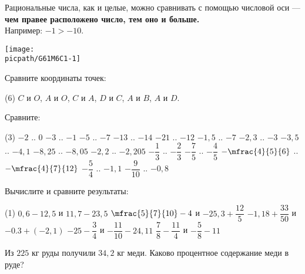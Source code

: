 	\begin{consultation}
		\begin{definit}
			Рациональные числа, как и целые, можно сравнивать с помощью числовой оси --- \textbf{чем правее расположено число, тем оно и больше.} \\ Например: \( -1 > -10 \).
		\end{definit}
		\begin{listofex}
			\item
			
			\begin{minipage}[c]{0.45\textwidth}
				\texttt{[image: \\picpath/G61M6C1-1]}
			\end{minipage}
			\begin{minipage}[c]{0.45\textwidth}
				Сравните координаты точек: 
				\begin{tasks}(6)
					\task \( C \) и \( O \),
					\task \( A \) и \( O \),
					\task \( C \) и \( A \),
					\task \( D \) и \( C \),
					\task \( A \) и \( B \),
					\task \( A \) и \( D \).
				\end{tasks}
			\end{minipage}
		\item Сравните:
		\begin{tasks}(3)
			\task \( -2 \) .. \( 0 \)
			\task \( -3 \) .. \( -1 \)
			\task \( -5 \) .. \( -7 \)
			\task \( -13 \) .. \( -14 \)
			\task \( -21 \) .. \( -12 \)
			\task \( -1,5 \) .. \( -7 \)
			\task \( -2,3 \) .. \( -3 \)
			\task \( -3,5 \) .. \( -4,1 \)
			\task \( -8,25 \) .. \( -8,05 \)
			\task \( -2,2 \) .. \( -2,205 \)
			\task \( -\dfrac{1}{3} \) .. \( -\dfrac{2}{3} \)
			\task \( -\dfrac{7}{5} \) .. \( -\dfrac{4}{5} \)
			\task \( -\mfrac{4}{5}{6} \) .. \( -\mfrac{4}{7}{12} \)
			\task \( -\dfrac{5}{4} \) .. \( -1,1 \)
			\task \( -\dfrac{9}{10} \) .. \( -0,8 \)
		\end{tasks}
		\item Вычислите и сравните результаты:
		\begin{tasks}(1)
			\task \( 0,6-12,5 \)  и  \( 11,7-23,5 \)
			\task \( \mfrac{5}{7}{10}-4 \) и \( -25,3 +\dfrac{12}{5} \)
			\task \( -1,18+\dfrac{33}{50} \) и \( -0.3 + (-2,1) \)
			\task \( -25-\dfrac{3}{4} \) и \(-\dfrac{11}{10}-24,11\)
			\task \( \dfrac{7}{8}-\dfrac{11}{4} \) и \( -\dfrac{5}{8}-11 \)
		\end{tasks}
		\item Из \(225\) кг руды получили \(34,2\) кг меди. Каково процентное содержание меди в руде?

\end{listofex}
\end{consultation}
